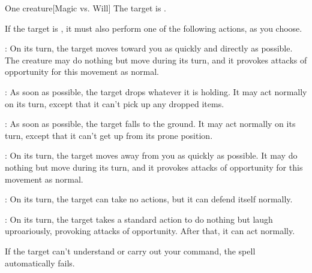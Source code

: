 \begin{spellheader}
    \spellrng{\rngmed}
\end{spellheader}
\begin{spelleffects}
    \begin{spelltarget}{One creature}[Magic vs. Will]
        \spellsuccess The target is \bewildered.

        If the target is \bloodied, it must also perform one of the following actions, as you choose.
        \par {}: On its turn, the target moves toward you as quickly and directly as possible. The creature may do nothing but move during its turn, and it provokes attacks of opportunity for this movement as normal.
        \par {}: As soon as possible, the target drops whatever it is holding. It may act normally on its turn, except that it can't pick up any dropped items.
        \par {}: As soon as possible, the target falls to the ground. It may act normally on its turn, except that it can't get up from its prone position.
        \par {}: On its turn, the target moves away from you as quickly as possible. It may do nothing but move during its turn, and it provokes attacks of opportunity for this movement as normal.
        \par {}: On its turn, the target can take no actions, but it can defend itself normally.
        \par {}: On its turn, the target takes a standard action to do nothing but laugh uproariously, provoking attacks of opportunity. After that, it can act normally.
    \end{spelltarget}
\end{spelleffects}
\begin{spellfooter}
    \spellnotes If the target can't understand or carry out your command, the spell automatically fails.
\end{spellfooter}

